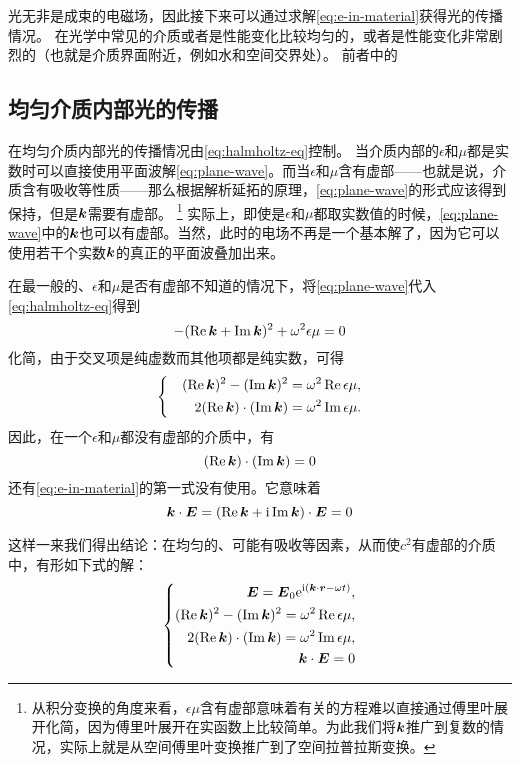 \documentclass[UTF8, a4paper]{ctexart}
\newcommand*{\ii}{\mathrm{i}}
\newcommand*{\ee}{\mathrm{e}}
\newenvironment{bigcase}{\left\{\quad\begin{aligned}}{\end{aligned}\right.}
\begin{document}
光无非是成束的电磁场，因此接下来可以通过求解\eqref{eq:e-in-material}获得光的传播情况。
在光学中常见的介质或者是性能变化比较均匀的，或者是性能变化非常剧烈的（也就是介质界面附近，例如水和空间交界处）。
前者中的

\subsection{均匀介质内部光的传播}\label{sec:in-interior-uniform}

在均匀介质内部光的传播情况由\eqref{eq:halmholtz-eq}控制。
当介质内部的$\epsilon$和$\mu$都是实数时可以直接使用平面波解\eqref{eq:plane-wave}。而当$\epsilon$和$\mu$含有虚部——也就是说，介质含有吸收等性质——那么根据解析延拓的原理，\eqref{eq:plane-wave}的形式应该得到保持，但是$\vb*{k}$需要有虚部。%
\footnote{从积分变换的角度来看，$\epsilon\mu$含有虚部意味着有关的方程难以直接通过傅里叶展开化简，因为傅里叶展开在实函数上比较简单。为此我们将$\vb*{k}$推广到复数的情况，实际上就是从空间傅里叶变换推广到了空间拉普拉斯变换。}
实际上，即使是$\epsilon$和$\mu$都取实数值的时候，\eqref{eq:plane-wave}中的$\vb*{k}$也可以有虚部。当然，此时的电场不再是一个基本解了，因为它可以使用若干个实数$\vb*{k}$的真正的平面波叠加出来。

在最一般的、$\epsilon$和$\mu$是否有虚部不知道的情况下，将\eqref{eq:plane-wave}代入\eqref{eq:halmholtz-eq}得到
\[
    - (\Re \vb*{k} + \Im \vb*{k})^2 + \omega^2 \epsilon\mu = 0
\]
化简，由于交叉项是纯虚数而其他项都是纯实数，可得
\[
    \begin{bigcase}
        (\Re \vb*{k})^2 - (\Im \vb*{k})^2 &= \omega^2\Re \epsilon\mu, \\
        2 (\Re \vb*{k}) \cdot (\Im \vb*{\vb*{k}}) &= \omega^2\Im \epsilon\mu.
    \end{bigcase}
\]
因此，在一个$\epsilon$和$\mu$都没有虚部的介质中，有
\[
    (\Re \vb*{k}) \cdot (\Im \vb*{\vb*{k}}) = 0
\]
还有\eqref{eq:e-in-material}的第一式没有使用。它意味着
\[
    \vb*{k} \cdot \vb*{E} = (\Re \vb*{k} + \ii \Im \vb*{k}) \cdot \vb*{E} = 0
\]

这样一来我们得出结论：在均匀的、可能有吸收等因素，从而使$c^2$有虚部的介质中，有形如下式的解：
\begin{equation}
    \left\{
        \begin{aligned}
            \vb*{E} = \vb*{E}_0 \ee^{\ii (\vb*{k} \cdot \vb*{r} - \omega t)}, \\
            (\Re \vb*{k})^2 - (\Im \vb*{k})^2 = \omega^2 \Re \epsilon\mu, \\
            2 (\Re \vb*{k}) \cdot (\Im \vb*{\vb*{k}}) = \omega^2 \Im \epsilon\mu, \\
            \vb*{k} \cdot \vb*{E} = 0
        \end{aligned}
    \right.
    \label{eq:uniform-wave}
\end{equation}
\end{document}
